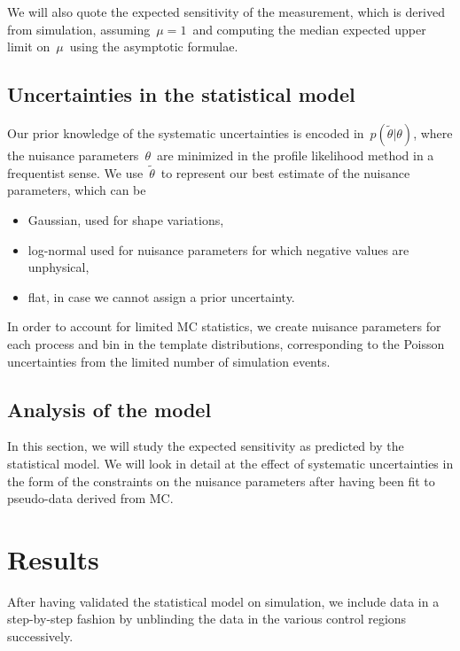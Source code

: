 We will also quote the expected sensitivity of the measurement, which is derived from simulation, assuming~$\mu = 1$~and computing the median expected upper limit on~$\mu$~using the asymptotic formulae. 

\subsection{Uncertainties in the statistical model}

Our prior knowledge of the systematic uncertainties is encoded in~$p(\tilde{\theta} | \theta)$, where the nuisance parameters~$\theta$~are minimized in the profile likelihood method in a frequentist sense. We use~$\tilde{\theta}$~to represent our best estimate of the nuisance parameters, which can be
\begin{itemize}
\item Gaussian, used for shape variations,
\item log-normal used for nuisance parameters for which negative values are unphysical,
\item flat, in case we cannot assign a prior uncertainty.
\end{itemize}
In order to account for limited MC statistics, we create nuisance parameters for each process and bin in the template distributions, corresponding to the Poisson uncertainties from the limited number of simulation events.

\subsection{Analysis of the model}
In this section, we will study the expected sensitivity as predicted by the statistical model. We will look in detail at the effect of systematic uncertainties in the form of the constraints on the nuisance parameters after having been fit to pseudo-data derived from MC.

\section{Results}
After having validated the statistical model on simulation, we include data in a step-by-step fashion by unblinding the data in the various control regions successively.


